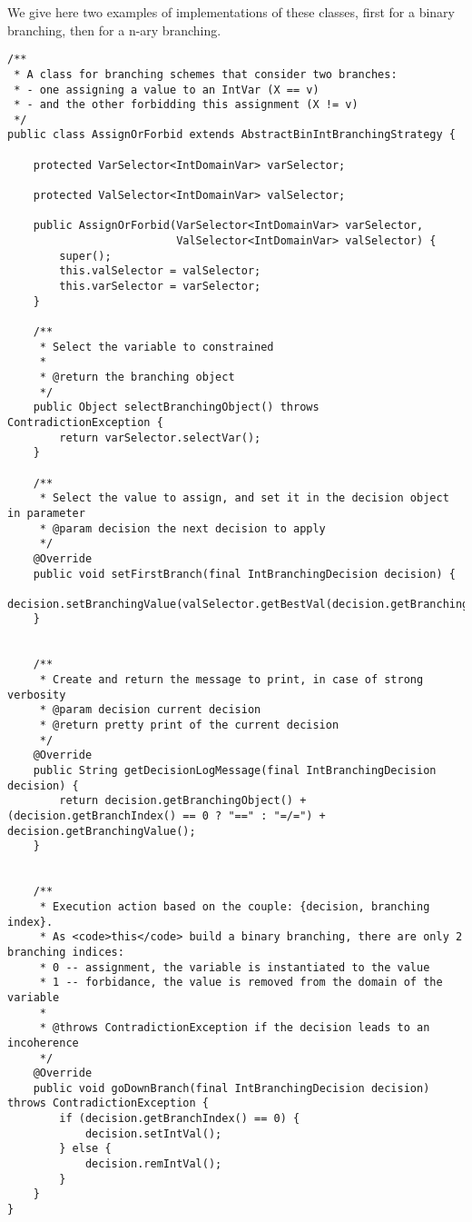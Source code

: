 We give here two examples of implementations of these classes, first for a binary branching, then for a n-ary branching. 
\begin{lstlisting}   
/**
 * A class for branching schemes that consider two branches: 
 * - one assigning a value to an IntVar (X == v) 
 * - and the other forbidding this assignment (X != v)
 */
public class AssignOrForbid extends AbstractBinIntBranchingStrategy {

    protected VarSelector<IntDomainVar> varSelector;

    protected ValSelector<IntDomainVar> valSelector;

    public AssignOrForbid(VarSelector<IntDomainVar> varSelector,
                          ValSelector<IntDomainVar> valSelector) {
        super();
        this.valSelector = valSelector;
        this.varSelector = varSelector;
    }

    /**
     * Select the variable to constrained
     *
     * @return the branching object
     */
    public Object selectBranchingObject() throws ContradictionException {
        return varSelector.selectVar();
    }

    /**
     * Select the value to assign, and set it in the decision object in parameter
     * @param decision the next decision to apply
     */
    @Override
    public void setFirstBranch(final IntBranchingDecision decision) {
        decision.setBranchingValue(valSelector.getBestVal(decision.getBranchingIntVar()));
    }


    /**
     * Create and return the message to print, in case of strong verbosity
     * @param decision current decision
     * @return pretty print of the current decision
     */
    @Override
    public String getDecisionLogMessage(final IntBranchingDecision decision) {
        return decision.getBranchingObject() +  (decision.getBranchIndex() == 0 ? "==" : "=/=") + decision.getBranchingValue();
    }


    /**
     * Execution action based on the couple: {decision, branching index}.
     * As <code>this</code> build a binary branching, there are only 2 branching indices:
     * 0 -- assignment, the variable is instantiated to the value
     * 1 -- forbidance, the value is removed from the domain of the variable
     *
     * @throws ContradictionException if the decision leads to an incoherence
     */
    @Override
    public void goDownBranch(final IntBranchingDecision decision) throws ContradictionException {
        if (decision.getBranchIndex() == 0) {
            decision.setIntVal();
        } else {
            decision.remIntVal();
        }
    }
}
\end{lstlisting}


